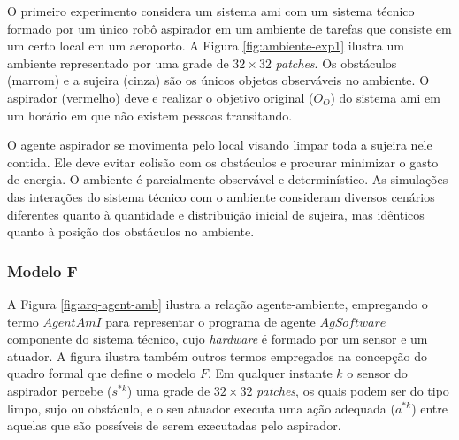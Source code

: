 O primeiro experimento considera um sistema \acrshort{ami} com um sistema técnico formado por um único robô aspirador em um ambiente de tarefas que consiste em um certo local em um aeroporto. A Figura \ref{fig:ambiente-exp1} ilustra um ambiente representado por uma grade de $32 \times 32$ \textit{patches}. Os obstáculos (marrom) e a sujeira (cinza) são os únicos objetos observáveis no ambiente. O aspirador (vermelho) deve e realizar o objetivo original ($O_O$) do sistema \acrshort{ami} em um horário em que não existem pessoas transitando. 

\begin{figure}[h!]
    \centering
\end{figure}

O agente aspirador se movimenta pelo local visando limpar toda a sujeira nele contida. Ele deve evitar colisão com os obstáculos e procurar minimizar o gasto de energia. O ambiente é parcialmente observável e determinístico. As simulações das interações do sistema técnico com o ambiente consideram diversos cenários diferentes quanto à quantidade e distribuição inicial de sujeira, mas idênticos quanto à posição dos obstáculos no ambiente. 

\subsubsection{Modelo F}

A Figura \ref{fig:arq-agent-amb} ilustra a relação agente-ambiente, empregando o termo $AgentAmI$ para representar o programa de agente $AgSoftware$ componente do sistema técnico, cujo \textit{hardware} é formado por um sensor e um atuador. A figura ilustra também outros termos empregados na concepção do quadro formal que define o modelo $F$. Em qualquer instante $k$ o sensor do aspirador percebe ($s^{*k}$) uma grade de $32 \times 32$ \textit{patches}, os quais podem ser do tipo limpo, sujo ou obstáculo, e o seu atuador executa uma ação adequada ($a^{*k}$) entre aquelas que são possíveis de serem executadas pelo aspirador.

